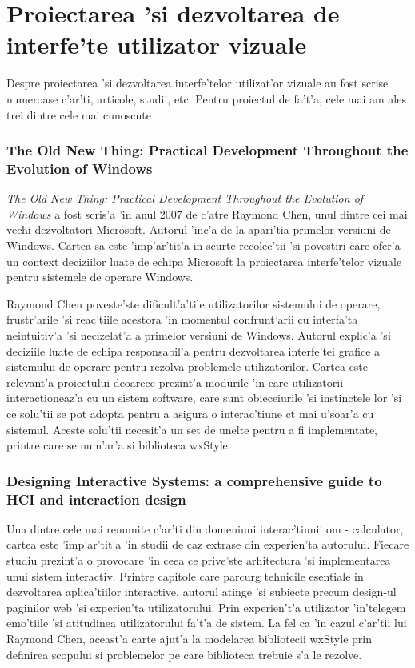 \section{Proiectarea 'si dezvoltarea de interfe'te utilizator vizuale}

Despre proiectarea 'si dezvoltarea interfe'telor utilizat'or vizuale au fost scrise numeroase c'ar'ti, articole, studii, etc. Pentru proiectul de fa't'a, cele mai am ales trei dintre cele mai cunoscute

\subsubsection{The Old New Thing: Practical Development Throughout the Evolution of Windows}

\emph{The Old New Thing: Practical Development Throughout the Evolution of Windows}\cite{theoldnewthing} a fost scris'a 'in anul 2007 de c'atre Raymond Chen, unul dintre cei mai vechi dezvoltatori Microsoft. Autorul  'inc'a de la apari'tia primelor versiuni de Windows. Cartea sa este 'imp'ar'tit'a in scurte recolec'tii 'si povestiri care ofer'a un context deciziilor luate de echipa Microsoft la proiectarea interfe'telor vizuale pentru sistemele de operare Windows.

\medskip

Raymond Chen poveste'ste dificult'a'tile utilizatorilor sistemului de operare, frustr'arile 'si reac'tiile acestora 'in momentul confrunt'arii cu interfa'ta neintuitiv'a 'si necizelat'a a primelor versiuni de Windows. Autorul explic'a 'si deciziile luate de echipa responsabil'a pentru dezvoltarea interfe'tei grafice a sistemului de operare pentru rezolva problemele utilizatorilor. Cartea este relevant'a proiectului deoarece prezint'a modurile 'in care utilizatorii interactioneaz'a cu un sistem software, care sunt obieceiurile 'si instinctele lor 'si ce solu'tii se pot adopta pentru a asigura o interac'tiune c{\ia}t mai u'soar'a cu sistemul. Aceste solu'tii necesit'a un set de unelte pentru a fi implementate, printre care se num'ar'a si biblioteca wxStyle.

\subsubsection{Designing Interactive Systems: a comprehensive guide to HCI and interaction design}

Una dintre cele mai renumite c'ar'ti din domeniuni interac'tiunii om - calculator, cartea este 'imp'ar'tit'a 'in studii de caz extrase din experien'ta autorului. Fiecare studiu prezint'a o provocare 'in ceea ce prive'ste arhitectura 'si implementarea unui sistem interactiv. Printre capitole care parcurg tehnicile esentiale in dezvoltarea aplica'tiilor interactive, autorul atinge 'si subiecte precum design-ul paginilor web 'si experien'ta utilizatorului. Prin experien't'a utilizator 'in'telegem emo'tiile 'si atitudinea utilizatorului fa't'a de sistem. La fel ca 'in cazul c'ar'tii lui Raymond Chen, aceast'a carte ajut'a la modelarea bibliotecii wxStyle prin definirea scopului si problemelor pe care biblioteca trebuie s'a le rezolve.

